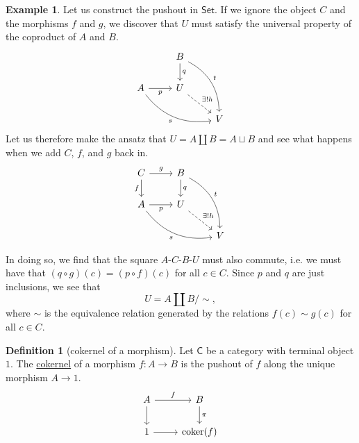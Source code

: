 \documentclass[a4paper,10pt]{scrreprt}
\newcommand{\defn}[1]{\ul{#1}}
\newcommand{\coker}{\mathrm{coker}}
\theoremstyle{definition}
\newtheorem{definition}{Definition}[section]
\newtheorem{example}{Example}[section]
\theoremstyle{plain}
\theoremstyle{remark}
\begin{document}
\begin{example}
  Let us construct the pushout in $\mathsf{Set}$. If we ignore the object $C$ and the morphisms $f$ and $g$, we discover that $U$ must satisfy the universal property of the coproduct of $A$ and $B$. 
  \begin{equation*}
    \begin{tikzcd}
      & B \arrow[d, "q"] \arrow[ddr, bend left, "t"] & \\
      A \arrow[drr, bend right, swap, "s"] \arrow[r, swap, "p"] & U \arrow[dr, dashed, "\exists!h"] & \\
      & & V
    \end{tikzcd}
  \end{equation*}
  Let us therefore make the ansatz that $U = A \amalg B = A \sqcup B$ and see what happens when we add $C$, $f$, and $g$ back in. 
  \begin{equation*}
    \begin{tikzcd}
      C \arrow[r, "g"] \arrow[d, swap, "f"] & B \arrow[d, "q"] \arrow[ddr, bend left, "t"] & \\
      A \arrow[drr, bend right, swap, "s"] \arrow[r, swap, "p"] & U \arrow[dr, dashed, "\exists!h"] & \\
      & & V
    \end{tikzcd}
  \end{equation*}

  In doing so, we find that the square $A$-$C$-$B$-$U$ must also commute, i.e. we must have that $(q \circ g) (c) = (p \circ f)(c)$ for all $c \in C$. Since $p$ and $q$ are just inclusions, we see that
  \begin{equation*}
    U = A \amalg B / \sim,
  \end{equation*}
  where $\sim$ is the equivalence relation generated by the relations $f(c) \sim g(c)$ for all $c\in C$.
\end{example}

\begin{definition}[cokernel of a morphism]
  \label{def:cokernalofmorphism}
  Let $\mathsf{C}$ be a category with terminal object $1$. The \defn{cokernel} of a morphism $f\colon A \to B$ is the pushout of $f$ along the unique morphism $A \to 1$.
  \begin{equation*}
    \begin{tikzcd}
      A \arrow[r, "f"] \arrow[d] & B \arrow[d, "\pi"] \\
      1 \arrow[r] & \coker(f)
    \end{tikzcd}
  \end{equation*}
\end{definition}
\end{document}
